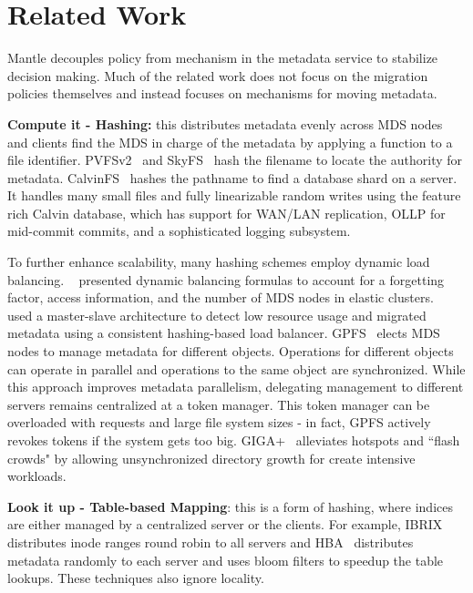 \section{Related Work}									%
\label{related-work}									%
Mantle decouples policy from mechanism in the metadata service to stabilize decision making. Much of the related work does not focus on the migration policies themselves and instead focuses on mechanisms for moving metadata. 

\textbf{Compute it - Hashing:} this distributes metadata evenly across MDS nodes and clients find the MDS in charge of the metadata by applying a function to a file identifier. PVFSv2~\cite{hildebrand:msst2005-pnfs} and SkyFS~\cite{xing:sc2009-skyfs} hash the filename to locate the authority for metadata. CalvinFS~\cite{thomson:fast2015-calvinfs} hashes the pathname to find a database shard on a server. It handles many small files and fully linearizable random writes using the feature rich Calvin database, which has support for WAN/LAN replication, OLLP for mid-commit commits, and a sophisticated logging subsystem. 

To further enhance scalability, many hashing schemes employ dynamic load balancing. ~\cite{li:msst2006-dynamic} presented dynamic balancing formulas to account for a forgetting factor, access information, and the number of MDS nodes in elastic clusters.~\cite{xing:sc2009-skyfs} used a master-slave architecture to detect low resource usage and migrated metadata using a consistent hashing-based load balancer. GPFS~\cite{schmuck:fast2002-gpfs} elects MDS nodes to manage metadata for different objects. Operations for different objects can operate in parallel and operations to the same object are synchronized. While this approach improves metadata parallelism, delegating management to different servers remains centralized at a token manager. This token manager can be overloaded with requests and large file system sizes - in fact, GPFS actively revokes tokens if the system gets too big. GIGA+~\cite{patil:fast2011-giga+} alleviates hotspots and ``flash crowds" by allowing unsynchronized directory growth for create intensive workloads. 


\textbf{Look it up - Table-based Mapping}: this is a form of hashing, where indices are either managed by a centralized server or the clients. For example, IBRIX~\cite{hp:whitepaper2012-storeall} distributes inode ranges round robin to all servers and HBA~\cite{zhu:pds2008-hba} distributes metadata randomly to each server and uses bloom filters to speedup the table lookups. These techniques also ignore locality.


